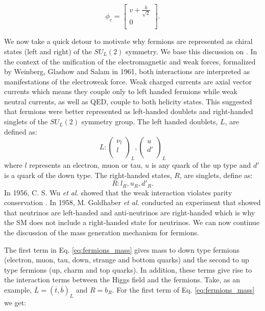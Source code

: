 \begin{equation}
	\phi_c=\begin{bmatrix}
	v+\frac{h}{\sqrt{2}} \\
	0 \\
	\end{bmatrix}.
\end{equation}

We now take a quick detour to motivate why fermions are represented as chiral states (left and right) of the $SU_L(2)$ symmetry. We base this discussion on \cite{rute}. In the context of the unification of the electromagnetic and weak forces, formalized by Weinberg, Glashow and Salam in 1961, both interactions are interpreted as manifestations of the electroweak force. Weak charged currents are axial vector currents which means they couple only to left handed fermions while weak neutral currents, as well as QED, couple to both helicity states. This suggested that fermions were better represented as left-handed doublets and right-handed singlets of the $SU_L(2)$ symmetry group. The left handed doublets, $L$, are defined as:
\begin{equation}
L:\begin{pmatrix}
\nu_l \\
l \\
\end{pmatrix}_L,
\begin{pmatrix}
u \\
d' \\
\end{pmatrix}_L
\end{equation}
where $l$ represents an electron, muon or tau, $u$ is any quark of the up type and $d'$ is a quark of the down type. The right-handed states, $R$, are singlets, define as:
\begin{equation}
	R: l_R,u_R,d'_R.
\end{equation} 
In 1956, C. S. Wu \textit{et al.} showed that the weak interaction violates parity conservation \cite{wu}. In 1958, M. Goldhaber \textit{et al.} conducted an experiment that showed that neutrinos are left-handed and anti-neutrinos are right-handed \cite{goldhaber} which is why the SM does not include a right-handed state for neutrinos. 
We can now continue the discussion of the mass generation mechanism for fermions.

The first term in Eq. \ref{eq:fermions_mass} gives mass to down type fermions (electron, muon, tau, down, strange and bottom quarks) and the second to up type fermions (up, charm and top quarks). In addition, these terms give rise to the interaction terms between the Higgs field and the fermions. Take, as an example, $\overline{L}=(\overline{t}, \overline{b})_L$ and $R=b_R$. For the first term of Eq. \ref{eq:fermions_mass} we get:

